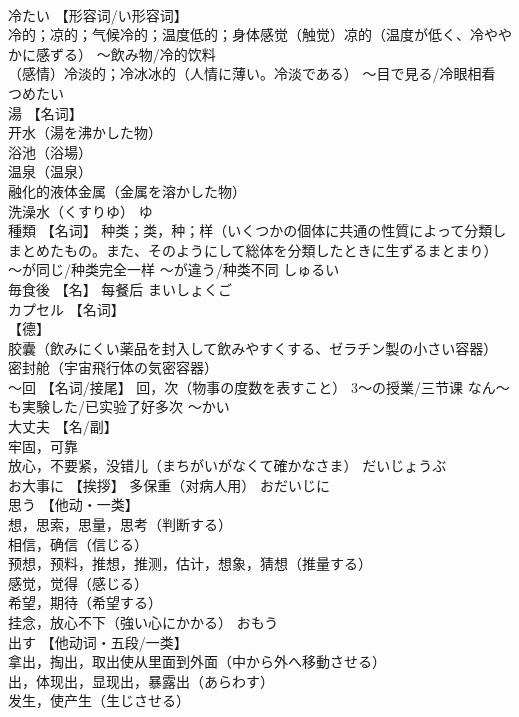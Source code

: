 \documentclass[8pt]{extreport}
\begin{document}
\begin{CJK}{UTF8}{min}
\\	冷たい	【形容词/い形容词】 
\\	冷的；凉的；气候冷的；温度低的；身体感觉（触觉）凉的（温度が低く、冷ややかに感ずる） 〜飲み物/冷的饮料 
\\	（感情）冷淡的；冷冰冰的（人情に薄い。冷淡である） 〜目で見る/冷眼相看	つめたい	
\\	湯	【名词】 
\\	开水（湯を沸かした物） 
\\	浴池（浴場） 
\\	温泉（温泉） 
\\	融化的液体金属（金属を溶かした物） 
\\	洗澡水（くすりゆ）	ゆ	
\\	種類	【名词】 种类；类，种；样（いくつかの個体に共通の性質によって分類しまとめたもの。また、そのようにして総体を分類したときに生ずるまとまり） 〜が同じ/种类完全一样 〜が違う/种类不同	しゅるい	
\\	毎食後	【名】 每餐后	まいしょくご	
\\	カプセル	【名词】 
\\	【德】
\\	胶囊（飲みにくい薬品を封入して飲みやすくする、ゼラチン製の小さい容器） 
\\	密封舱（宇宙飛行体の気密容器）		
\\	〜回	【名词/接尾】 回，次（物事の度数を表すこと） 3～の授業/三节课 なん～も実験した/已实验了好多次	〜かい	
\\	大丈夫	【名/副】 
\\	牢固，可靠 
\\	放心，不要紧，没错儿（まちがいがなくて確かなさま）	だいじょうぶ	
\\	お大事に	【挨拶】 多保重（对病人用）	おだいじに	
\\	思う	【他动・一类】 
\\	想，思索，思量，思考（判断する） 
\\	相信，确信（信じる） 
\\	预想，预料，推想，推测，估计，想象，猜想（推量する） 
\\	感觉，觉得（感じる） 
\\	希望，期待（希望する） 
\\	挂念，放心不下（強い心にかかる）	おもう	
\\	出す	【他动词・五段/一类】 
\\	拿出，掏出，取出使从里面到外面（中から外へ移動させる） 
\\	出，体现出，显现出，暴露出（あらわす） 
\\	发生，使产生（生じさせる） 

\end{CJK}
\end{document}
